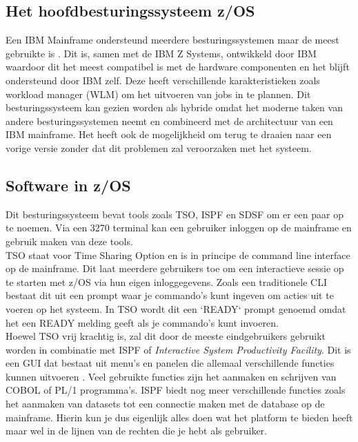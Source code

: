 \subsection{Het hoofdbesturingssysteem z/OS}
Een IBM Mainframe ondersteund meerdere besturingssystemen maar de meest gebruikte is . Dit is, samen met de IBM Z Systems, ontwikkeld door IBM waardoor dit het meest compatibel is met de hardware componenten en het blijft ondersteund door IBM zelf. Deze heeft verschillende karakteristieken zoals workload manager (WLM) om het uitvoeren van jobs in te plannen. Dit besturingssysteem kan gezien worden als hybride omdat het moderne taken van andere besturingssystemen neemt en combineerd met de architectuur van een IBM mainframe. Het heeft ook de mogelijkheid om terug te draaien naar een vorige versie zonder dat dit problemen zal veroorzaken met het systeem. \autocite{Rupp2022} 

\subsection{Software in z/OS}
Dit besturingssysteem bevat tools zoals TSO, ISPF en SDSF om er een paar op te noemen. Via een 3270 terminal kan een gebruiker inloggen op de mainframe en gebruik maken van deze tools. \\

TSO staat voor Time Sharing Option en is in principe de command line interface op de mainframe. Dit laat meerdere gebruikers toe om een interactieve sessie op te starten met z/OS via hun eigen inloggegevens. Zoals een traditionele CLI bestaat dit uit een prompt waar je commando's kunt ingeven om acties uit te voeren op het systeem. In TSO wordt dit een `READY` prompt genoemd omdat het een READY melding geeft als je commando's kunt invoeren. \autocite{IBM} \\

Hoewel TSO vrij krachtig is, zal dit door de meeste eindgebruikers gebruikt worden in combinatie met ISPF of \textit{Interactive System Productivity Facility}. Dit is een GUI dat bestaat uit menu's en panelen die allemaal verschillende functies kunnen uitvoeren \autocite{IBM}. Veel gebruikte functies zijn het aanmaken en schrijven van COBOL of PL/1 programma's. ISPF biedt nog meer verschillende functies zoals het aanmaken van datasets tot een connectie maken met de database op de mainframe. Hierin kun je dus eigenlijk alles doen wat het platform te bieden heeft maar wel in de lijnen van de rechten die je hebt als gebruiker. \autocite{IBM} \\

